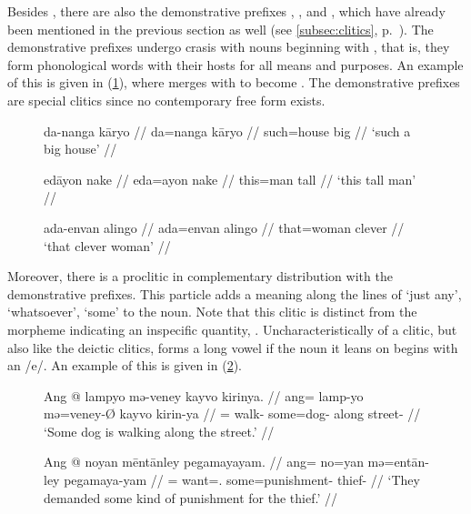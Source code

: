 Besides , there are also the demonstrative prefixes
, , and ,
which have already been mentioned in the previous section as well (see
\autoref{subsec:clitics}, p.~\pageref{clitics_prenoun_dem}). The demonstrative
prefixes undergo crasis with nouns beginning with , that is, they form
phonological words with their hosts for all means and purposes. An example of
this is given in (\ref{ex:noundemclit}), where  merges
with  to become . The
demonstrative prefixes are special clitics since no contemporary free form
exists.

\begin{figure}[h]
\pex\label{ex:noundemclit}
\a\begingl
	\gla da-nanga kāryo //
	\glb da=nanga kāryo //
	\glc such=house big //
	\glft `such a big house' //
\endgl

\a\begingl
	\gla edāyon nake //
	\glb eda=ayon nake //
	\glc this=man tall //
	\glft `this tall man' //
\endgl

\a\begingl
	\gla ada-envan alingo //
	\glb ada=envan alingo //
	\glc that=woman clever //
	\glft `that clever woman' //
\endgl
\xe
\end{figure}

Moreover, there is a proclitic  in complementary distribution
with the demonstrative prefixes. This particle adds a meaning along the lines
of `just any', `whatsoever', `some' to the noun. Note that this clitic is
distinct from the morpheme indicating an inspecific quantity,
. Uncharacteristically of a clitic, but also like the
deictic clitics,  forms a long vowel if the noun it leans on
begins with an /e/. An example of this is given in (\ref{ex:menoun}).

\begin{figure}[h]
\pex\label{ex:menoun}
\a\begingl
	\gla Ang @ lampyo mə-veney kayvo kirinya. //
	\glb ang= lamp-yo mə=veney-Ø kayvo kirin-ya //
	\glc \AgtT{}= walk-\TsgN{} some=dog-\Top{} along street-\Loc{} //
	\glft `Some dog is walking along the street.' //
\endgl

\a\begingl
	\gla Ang @ noyan mēntānley pegamayayam. //
	\glb ang= no=yan mə=entān-ley pegamaya-yam //
	\glc \AgtT{}= want=\TsgM{}.\Top{} some=punishment-\PargI{} 
		thief-\Dat{} //
	\glft `They demanded some kind of punishment for the thief.' //
\endgl
\xe
\end{figure}

